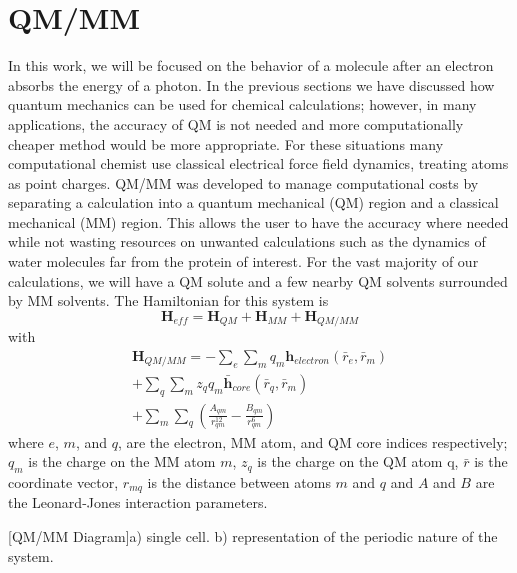 \section{QM/MM}
    In this work, we will be focused on the behavior of a molecule after an electron absorbs the energy of a photon.
    In the previous sections we have discussed how quantum mechanics can be used for chemical calculations;
    however, in many applications, the accuracy of QM is not needed and more computationally cheaper method would be more appropriate.
    For these situations many computational chemist use classical electrical force field dynamics, treating atoms as point charges.
    QM/MM was developed to manage computational costs by separating a calculation into a quantum mechanical (QM) region and a classical mechanical (MM) region.\cite{Karplus2014}
    This allows the user to have the accuracy where needed while not wasting resources on unwanted calculations such as the dynamics of water molecules far from the protein of interest.
    For the vast majority of our calculations, we will have a QM solute and a few nearby QM solvents surrounded by MM solvents.
    The Hamiltonian for this system is 
    \begin{equation}
     \mathbf{H}_{eff}=\mathbf{H}_{QM}+\mathbf{H}_{MM}+\mathbf{H}_{QM/MM} 
    \end{equation}
    with
    \begin{align}\label{eq:qmmm}
      \mathbf{H}_{QM/MM}=-\sum_{e}\sum_mq_m\mathbf{h}_{electron}(\bar{r}_e,\bar{r}_m)\\
      +\sum_q\sum_mz_qq_m\bar{\mathbf{h}}_{core}(\bar{r}_q,\bar{r}_m)\\
      +\sum_m\sum_q\left( \frac{A_{qm}}{r_{qm}^{12}}-\frac{B_{qm}}{r_{qm}^6} \right)
    \end{align}
    where $e$, $m$, and $q$, are the electron, MM atom, and QM core indices respectively;
    $q_m$ is the charge on the MM atom $m$, $z_q$ is the charge on the QM atom q, $\bar{r}$ is the coordinate vector, $r_{mq}$ is the distance between atoms $m$ and $q$ and $A$ and $B$ are the Leonard-Jones interaction parameters.\cite{Walker2008}

    \begin{multiFigure} 
    [QM/MM Diagram]{a) single cell. b) representation of the periodic nature of the system.}
    \label{fig:QMMMDiagram}
    \end{multiFigure}

